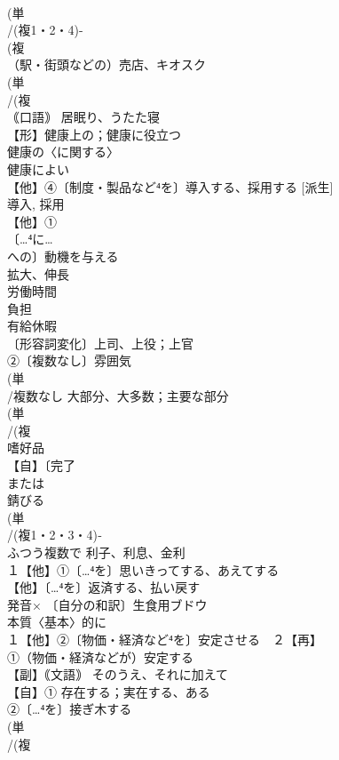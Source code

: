 \documentclass[8pt]{extreport}
\begin{document}
\begin{CJK}{UTF8}{min}
\\	(単
\\	/(複1・2・4)-
\\	(複
\\	（駅・街頭などの）売店、キオスク
\\	(単
\\	/(複
\\	｟口語｠ 居眠り、うたた寝 
\\	【形】健康上の；健康に役立つ　
\\	健康の〈に関する〉　
\\	健康によい
\\	【他】④〔制度・製品など⁴を〕導入する、採用する [派生] 
\\	導入, 採用
\\	【他】①
\\	〔…⁴に…
\\	への〕動機を与える
\\	拡大、伸長
\\	労働時間
\\	負担
\\	有給休暇
\\	〔形容詞変化〕上司、上役；上官
\\	②〔複数なし〕雰囲気
\\	(単
\\	/複数なし 大部分、大多数；主要な部分
\\	(単
\\	/(複
\\	嗜好品
\\	【自】〔完了
\\	または
\\	錆びる
\\	(単
\\	/(複1・2・3・4)‐
\\	ふつう複数で 利子、利息、金利 
\\	１【他】①〔…⁴を〕思いきってする、あえてする 
\\	【他】〔…⁴を〕返済する、払い戻す 
\\	発音×	〔自分の和訳〕生食用ブドウ 
\\	本質〈基本〉的に
\\	１【他】②〔物価・経済など⁴を〕安定させる　２【再】
\\	①（物価・経済などが）安定する
\\	【副】｟文語｠ そのうえ、それに加えて
\\	【自】① 存在する；実在する、ある 
\\	②〔…⁴を〕接ぎ木する
\\	(単
\\	/(複

\end{CJK}
\end{document}
